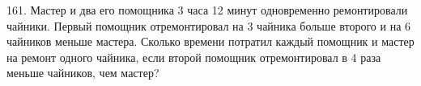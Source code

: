 161. Мастер и два его помощника 3 часа 12 минут одновременно ремонтировали чайники. Первый помощник отремонтировал на 3 чайника больше второго и на 6 чайников меньше мастера. Сколько времени потратил каждый помощник и мастер на ремонт одного чайника, если второй помощник отремонтировал в 4 раза меньше чайников, чем мастер?\\
